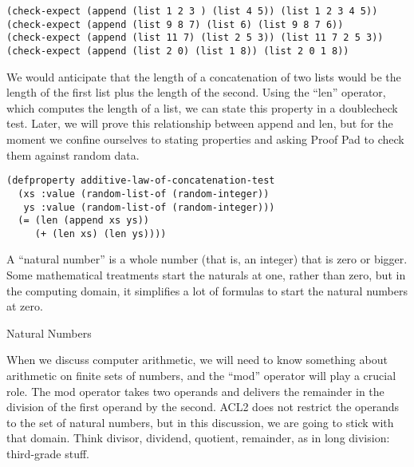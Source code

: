 \begin{Verbatim}
(check-expect (append (list 1 2 3 ) (list 4 5)) (list 1 2 3 4 5))
(check-expect (append (list 9 8 7) (list 6) (list 9 8 7 6))
(check-expect (append (list 11 7) (list 2 5 3)) (list 11 7 2 5 3))
(check-expect (append (list 2 0) (list 1 8)) (list 2 0 1 8))
\end{Verbatim}

We would anticipate that the length of a concatenation of two lists
would be the length of the first list plus the length of the second.
\label{len-op-informal}
Using the ``len'' operator,
which computes the length of a list,
we can state this property in a doublecheck test.
Later, we will prove this relationship between append and len,
but for the moment we confine ourselves to stating properties
and asking Proof Pad to check them against random data.

\label{additive-lengths-test}
\begin{Verbatim}
(defproperty additive-law-of-concatenation-test
  (xs :value (random-list-of (random-integer))
   ys :value (random-list-of (random-integer)))
  (= (len (append xs ys))
     (+ (len xs) (len ys))))
\end{Verbatim}

\begin{aside}
A ``natural number'' is a whole number (that is, an integer)
that is zero or bigger.
Some mathematical treatments start the naturals at one,
rather than zero, but in the computing domain,
it simplifies a lot of formulas to start the natural numbers at zero.
\caption{Natural Numbers}
\label{natural-number-def}
\end{aside}

When we discuss computer arithmetic, we will need to know something about
arithmetic on finite sets of numbers, and the ``mod'' operator will play a crucial role.
\label{mod-function}
The mod operator takes two operands and
delivers the remainder in the division of the first operand by the second.
ACL2 does not restrict the operands to the set of natural numbers,
but in this discussion, we are going to stick with that domain.
Think
divisor, dividend, quotient, remainder,
as in
long division: 
third-grade stuff.

